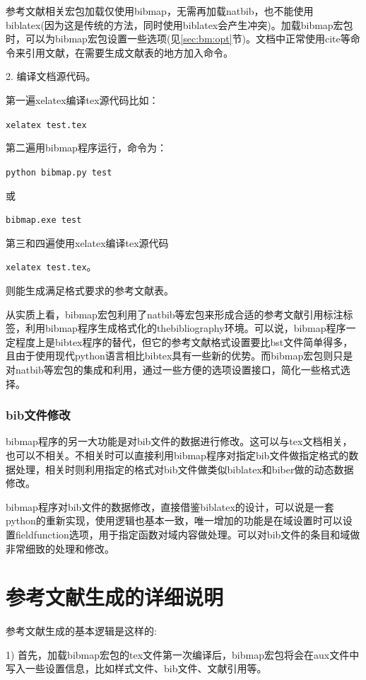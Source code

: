 \documentclass{article}
\begin{document}
参考文献相关宏包加载仅使用bibmap，无需再加载natbib，也不能使用biblatex(因为这是传统的方法，同时使用biblatex会产生冲突)。加载bibmap宏包时，可以为bibmap宏包设置一些选项(见\ref{sec:bm:opt}节)。文档中正常使用cite等命令来引用文献，在需要生成文献表的地方加入命令\verb||。

2. 编译文档源代码。

第一遍xelatex编译tex源代码比如：

\verb|xelatex test.tex|

第二遍用bibmap程序运行，命令为：

\verb|python bibmap.py test|

或

\verb|bibmap.exe test|

第三和四遍使用xelatex编译tex源代码

\verb|xelatex test.tex|。

则能生成满足格式要求的参考文献表。

从实质上看，bibmap宏包利用了natbib等宏包来形成合适的参考文献引用标注标签，利用bibmap程序生成格式化的thebibliography环境。可以说，bibmap程序一定程度上是bibtex程序的替代，但它的参考文献格式设置要比bst文件简单得多，且由于使用现代python语言相比bibtex具有一些新的优势。而bibmap宏包则只是对natbib等宏包的集成和利用，通过一些方便的选项设置接口，简化一些格式选择。

\subsubsection{bib文件修改}

bibmap程序的另一大功能是对bib文件的数据进行修改。这可以与tex文档相关，也可以不相关。不相关时可以直接利用bibmap程序对指定bib文件做指定格式的数据处理，相关时则利用指定的格式对bib文件做类似biblatex和biber做的动态数据修改。

bibmap程序对bib文件的数据修改，直接借鉴biblatex的设计，可以说是一套python的重新实现，使用逻辑也基本一致，唯一增加的功能是在域设置时可以设置fieldfunction选项，用于指定函数对域内容做处理。可以对bib文件的条目和域做非常细致的处理和修改。

\section{参考文献生成的详细说明}

参考文献生成的基本逻辑是这样的:

1)  首先，加载bibmap宏包的tex文件第一次编译后，bibmap宏包将会在aux文件中写入一些设置信息，比如样式文件、bib文件、文献引用等。
\end{document}
